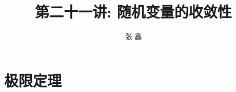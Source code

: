 \title[概率论]{第二十一讲: 随机变量的收敛性}
\author[张鑫{\rm Email: x.zhang.seu@foxmail.com}]{\large 张 鑫}
\date{}



{ 
	\begin{frame}
		\titlepage
	\end{frame}
}





\section{极限定理}
